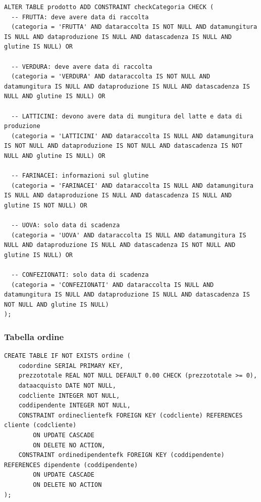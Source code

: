 \documentclass[a4paper,12pt]{article}
\begin{document}
\vspace{1.5em}
\begin{lstlisting}[style=sqlstyle]
ALTER TABLE prodotto ADD CONSTRAINT checkCategoria CHECK (
  -- FRUTTA: deve avere data di raccolta
  (categoria = 'FRUTTA' AND dataraccolta IS NOT NULL AND datamungitura IS NULL AND dataproduzione IS NULL AND datascadenza IS NULL AND glutine IS NULL) OR
  
  -- VERDURA: deve avere data di raccolta  
  (categoria = 'VERDURA' AND dataraccolta IS NOT NULL AND datamungitura IS NULL AND dataproduzione IS NULL AND datascadenza IS NULL AND glutine IS NULL) OR
  
  -- LATTICINI: devono avere data di mungitura del latte e data di produzione
  (categoria = 'LATTICINI' AND dataraccolta IS NULL AND datamungitura IS NOT NULL AND dataproduzione IS NOT NULL AND datascadenza IS NOT NULL AND glutine IS NULL) OR
  
  -- FARINACEI: informazioni sul glutine
  (categoria = 'FARINACEI' AND dataraccolta IS NULL AND datamungitura IS NULL AND dataproduzione IS NULL AND datascadenza IS NULL AND glutine IS NOT NULL) OR
  
  -- UOVA: solo data di scadenza
  (categoria = 'UOVA' AND dataraccolta IS NULL AND datamungitura IS NULL AND dataproduzione IS NULL AND datascadenza IS NOT NULL AND glutine IS NULL) OR
  
  -- CONFEZIONATI: solo data di scadenza
  (categoria = 'CONFEZIONATI' AND dataraccolta IS NULL AND datamungitura IS NULL AND dataproduzione IS NULL AND datascadenza IS NOT NULL AND glutine IS NULL)
);
\end{lstlisting}
\vspace{1.5em}
\subsubsection*{Tabella ordine}

\vspace{1.5em}
\begin{lstlisting}[style=sqlstyle]
CREATE TABLE IF NOT EXISTS ordine (
    codordine SERIAL PRIMARY KEY,
    prezzototale REAL NOT NULL DEFAULT 0.00 CHECK (prezzototale >= 0),
    dataacquisto DATE NOT NULL,
    codcliente INTEGER NOT NULL,
    coddipendente INTEGER NOT NULL,
    CONSTRAINT ordineclientefk FOREIGN KEY (codcliente) REFERENCES cliente (codcliente)
        ON UPDATE CASCADE
        ON DELETE NO ACTION,
    CONSTRAINT ordinedipendentefk FOREIGN KEY (coddipendente) REFERENCES dipendente (coddipendente)
        ON UPDATE CASCADE
        ON DELETE NO ACTION
);
\end{lstlisting}
\vspace{1.5em}
\end{document}
